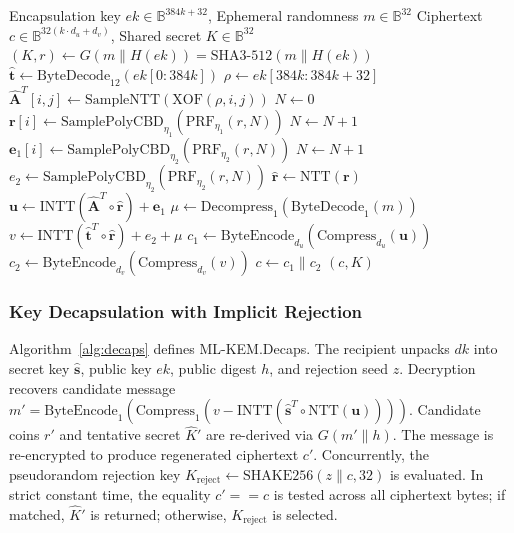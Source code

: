 \begin{algorithm}[t]
\caption{\mbox{ML-KEM.Encaps}$(ek, m)$ \cite{fips203}}
\label{alg:encaps}
\begin{algorithmic}[1]
\Require Encapsulation key $ek \in \mathbb{B}^{384k + 32}$, Ephemeral randomness $m \in \mathbb{B}^{32}$
\Ensure Ciphertext $c \in \mathbb{B}^{32(k\cdot d_u + d_v)}$, Shared secret $K \in \mathbb{B}^{32}$
\State $(K, r) \leftarrow G(m \parallel H(ek)) = \text{SHA3-512}(m \parallel H(ek))$
\State $\hat{\mathbf{t}} \leftarrow \text{ByteDecode}_{12}(ek[0 : 384k])$
\State $\rho \leftarrow ek[384k : 384k + 32]$
 
        \State $\hat{\mathbf{A}}^T[i, j] \leftarrow \text{SampleNTT}(\text{XOF}(\rho, i, j))$
    \EndFor
\EndFor
\State $N \leftarrow 0$
 
    \State $\mathbf{r}[i] \leftarrow \text{SamplePolyCBD}_{\eta_1}(\text{PRF}_{\eta_1}(r, N))$
    \State $N \leftarrow N + 1$
\EndFor
{}
    \State $\mathbf{e}_1[i] \leftarrow \text{SamplePolyCBD}_{\eta_2}(\text{PRF}_{\eta_2}(r, N))$
    \State $N \leftarrow N + 1$
\EndFor
\State $e_2 \leftarrow \text{SamplePolyCBD}_{\eta_2}(\text{PRF}_{\eta_2}(r, N))$
\State $\hat{\mathbf{r}} \leftarrow \text{NTT}(\mathbf{r})$
\State $\mathbf{u} \leftarrow \text{INTT}(\hat{\mathbf{A}}^T \circ \hat{\mathbf{r}}) + \mathbf{e}_1$
\State $\mu \leftarrow \text{Decompress}_1(\text{ByteDecode}_1(m))$
\State $v \leftarrow \text{INTT}(\hat{\mathbf{t}}^T \circ \hat{\mathbf{r}}) + e_2 + \mu$
\State $c_1 \leftarrow \text{ByteEncode}_{d_u}(\text{Compress}_{d_u}(\mathbf{u}))$
\State $c_2 \leftarrow \text{ByteEncode}_{d_v}(\text{Compress}_{d_v}(v))$
\State $c \leftarrow c_1 \parallel c_2$
\State \Return $(c, K)$
\end{algorithmic}
\end{algorithm}

\subsubsection{Key Decapsulation with Implicit Rejection}
Algorithm~\ref{alg:decaps} defines \mbox{ML-KEM.Decaps}. The recipient unpacks $dk$ into secret key $\hat{\mathbf{s}}$, public key $ek$, public digest $h$, and rejection seed $z$. Decryption recovers candidate message $m' = \text{ByteEncode}_1(\text{Compress}_1(v - \text{INTT}(\hat{\mathbf{s}}^T \circ \text{NTT}(\mathbf{u}))))$. Candidate coins $r'$ and tentative secret $\hat{K}'$ are re-derived via $G(m' \parallel h)$. The message is re-encrypted to produce regenerated ciphertext $c'$. Concurrently, the pseudorandom rejection key $K_{\text{reject}} \leftarrow \text{SHAKE256}(z \parallel c, 32)$ is evaluated. In strict constant time, the equality $c' == c$ is tested across all ciphertext bytes; if matched, $\hat{K}'$ is returned; otherwise, $K_{\text{reject}}$ is selected.

